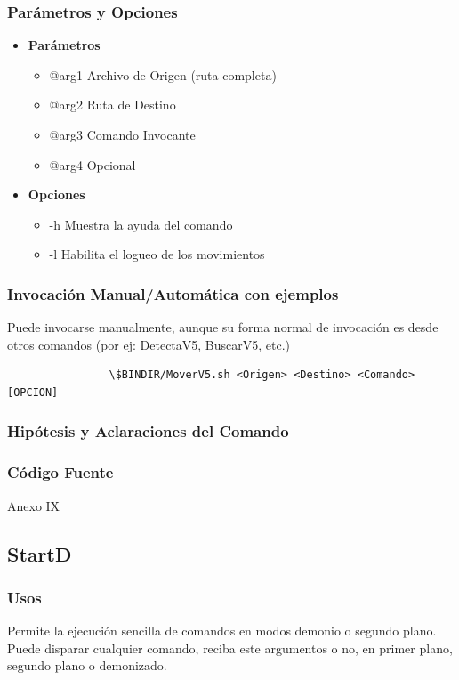 \documentclass[a4paper,10pt,titlepage]{article}
\begin{document}
		\subsubsection{Par\'ametros y Opciones}
			\begin {itemize}
				\item \textbf{Par\'ametros} {
					\begin{itemize}
						\item {@arg1 }{Archivo de Origen (ruta completa)} 
						\item {@arg2 }{Ruta de Destino } 
						\item {@arg3 }{Comando Invocante} 
						\item {@arg4 }{Opcional} 
					\end{itemize}
				}
				\item \textbf{Opciones}{
					\begin{itemize}
						\item {-h }{Muestra la ayuda del comando} 
						\item {-l }{Habilita el logueo de los movimientos} 
					\end{itemize}
				}
			\end{itemize}
	
		\subsubsection{Invocaci\'on Manual/Autom\'atica con ejemplos}
			Puede invocarse manualmente, aunque su forma normal de invocaci\'on es desde otros comandos (por ej: DetectaV5, BuscarV5, etc.)
			\begin{verbatim}
				\$BINDIR/MoverV5.sh <Origen> <Destino> <Comando> [OPCION]
			\end{verbatim}

		\subsubsection{Hip\'otesis y Aclaraciones del Comando}

		\subsubsection{C\'odigo Fuente}
			Anexo IX

	\subsection{StartD}
		\subsubsection{Usos}
			Permite la ejecuci\'on sencilla de comandos en modos demonio o segundo plano. Puede disparar cualquier comando, reciba este argumentos o no, en primer plano, segundo plano o demonizado.
\end{document}

